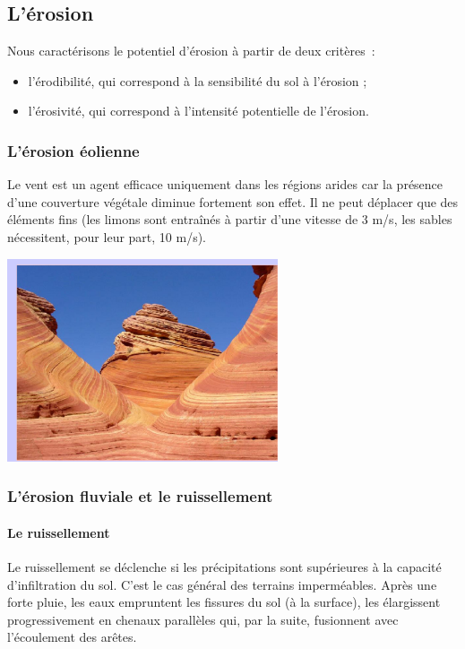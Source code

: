 \documentclass[a4paper,11pt]{article}
\begin{document}
\subsection{L'érosion}

Nous caractérisons le potentiel d'érosion à partir de deux critères~:
\begin{itemize}
  \item l'érodibilité, qui correspond à la sensibilité du sol à l'érosion ;
  \item l'érosivité, qui correspond à l'intensité potentielle de l'érosion.
\end{itemize}

\subsubsection{L'érosion éolienne}

Le vent est un agent efficace uniquement dans les régions arides car la présence d'une couverture végétale diminue fortement son effet.
Il ne peut déplacer que des éléments fins (les limons sont entraînés à partir d'une vitesse de 3 m/s, les sables nécessitent, pour leur part, 10 m/s).

\begin{center}
  \includegraphics[width=8cm]{Images/Erosion/erosion_eolienne.JPG}
\end{center}

\subsubsection{L'érosion fluviale et le ruissellement}

\paragraph{Le ruissellement}
\medbreak
Le ruissellement se déclenche si les précipitations sont supérieures à la capacité d'infiltration du sol. C'est le cas général des terrains imperméables. 
Après une forte pluie, les eaux empruntent les fissures du sol (à la surface), les élargissent progressivement en chenaux parallèles qui, par la suite, fusionnent avec l'écoulement des arêtes.
\end{document}
